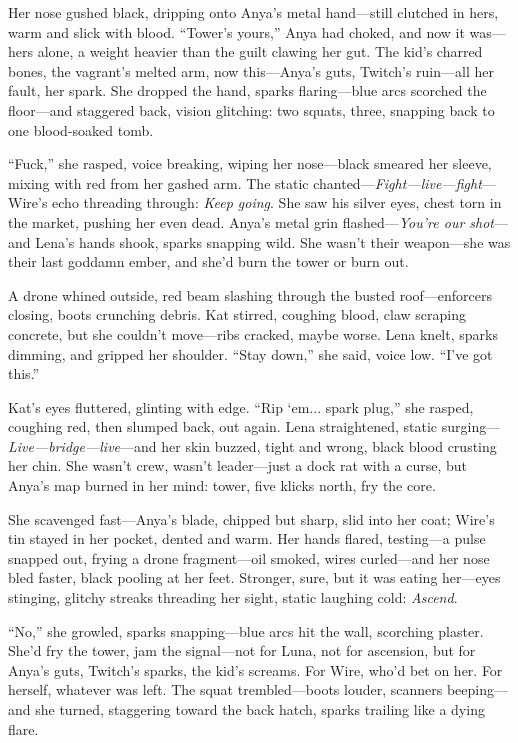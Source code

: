 \documentclass[12pt]{book}
\begin{document}
Her nose gushed black, dripping onto Anya’s metal hand---still clutched in hers, warm and slick with blood. ``Tower’s yours,'' Anya had choked, and now it was---hers alone, a weight heavier than the guilt clawing her gut. The kid’s charred bones, the vagrant’s melted arm, now this---Anya’s guts, Twitch’s ruin---all her fault, her spark. She dropped the hand, sparks flaring---blue arcs scorched the floor---and staggered back, vision glitching: two squats, three, snapping back to one blood-soaked tomb.

``Fuck,'' she rasped, voice breaking, wiping her nose---black smeared her sleeve, mixing with red from her gashed arm. The static chanted---\emph{Fight---live---fight}---Wire’s echo threading through: \emph{Keep going}. She saw his silver eyes, chest torn in the market, pushing her even dead. Anya’s metal grin flashed---\emph{You’re our shot}---and Lena’s hands shook, sparks snapping wild. She wasn’t their weapon---she was their last goddamn ember, and she’d burn the tower or burn out.

A drone whined outside, red beam slashing through the busted roof---enforcers closing, boots crunching debris. Kat stirred, coughing blood, claw scraping concrete, but she couldn’t move---ribs cracked, maybe worse. Lena knelt, sparks dimming, and gripped her shoulder. ``Stay down,'' she said, voice low. ``I’ve got this.''

Kat’s eyes fluttered, glinting with edge. ``Rip ‘em... spark plug,'' she rasped, coughing red, then slumped back, out again. Lena straightened, static surging---\emph{Live---bridge---live}---and her skin buzzed, tight and wrong, black blood crusting her chin. She wasn’t crew, wasn’t leader---just a dock rat with a curse, but Anya’s map burned in her mind: tower, five klicks north, fry the core.

She scavenged fast---Anya’s blade, chipped but sharp, slid into her coat; Wire’s tin stayed in her pocket, dented and warm. Her hands flared, testing---a pulse snapped out, frying a drone fragment---oil smoked, wires curled---and her nose bled faster, black pooling at her feet. Stronger, sure, but it was eating her---eyes stinging, glitchy streaks threading her sight, static laughing cold: \emph{Ascend}.

``No,'' she growled, sparks snapping---blue arcs hit the wall, scorching plaster. She’d fry the tower, jam the signal---not for Luna, not for ascension, but for Anya’s guts, Twitch’s sparks, the kid’s screams. For Wire, who’d bet on her. For herself, whatever was left. The squat trembled---boots louder, scanners beeping---and she turned, staggering toward the back hatch, sparks trailing like a dying flare.
\end{document}
